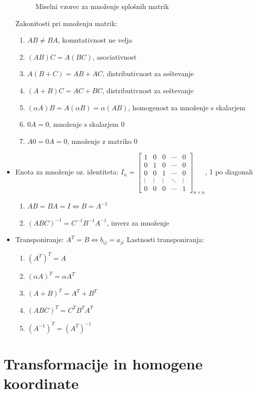 \documentclass{article}
\begin{document}
\begin{itemize}
\begin{figure}[H]
\caption{Miselni vzorec za množenje splošnih matrik}
\end{figure}
Zakonitosti pri množenju matrik:
\begin{enumerate}
    \item $AB \not = BA$, komutativnost ne velja
    \item $(AB)C = A(BC)$, asociativnost
    \item $A(B + C) = AB + AC$, distributivnost za seštevanje
    \item $(A + B)C = AC + BC$, distributivnost za seštevanje
    \item $(\alpha A)B = A(\alpha B) = \alpha (AB)$, homogenost za množenje s skalarjem
    \item $0A = 0$, množenje s skalarjem 0
    \item $A0 = 0A = 0$, množenje z matriko 0
\end{enumerate}
\item Enota za množenje oz. identiteta: $I_n = \begin{bmatrix} 
1 & 0 & 0 & \cdots & 0 \\ 0 & 1 & 0 & \cdots & 0 \\ 0 & 0 & 1 & \cdots & 0 \\ \vdots & \vdots & \vdots & \ddots & \vdots \\ 0 & 0 & 0 & \cdots & 1 \end{bmatrix}_{n \times n}$, 1 po diagonali
\begin{enumerate}
    \item $AB = BA = I \iff B = A^{-1}$
    \item $(ABC)^{-1} = C^{-1}B^{-1}A^{-1}$, inverz za množenje
\end{enumerate}
\item Transponiranje: $A^T = B \iff b_{ij} = a_{ji}$
Lastnosti transponiranja:
\begin{enumerate} 
    \item $(A^T)^T = A$
    \item $(\alpha A)^T = \alpha A^T$
    \item $(A + B)^T = A^T + B^T$
    \item $(ABC)^T = C^TB^TA^T$
    \item $(A^{-1})^T = (A^T)^{-1}$
\end{enumerate}
\end{itemize}

\section{Transformacije in homogene koordinate}
\end{document}
